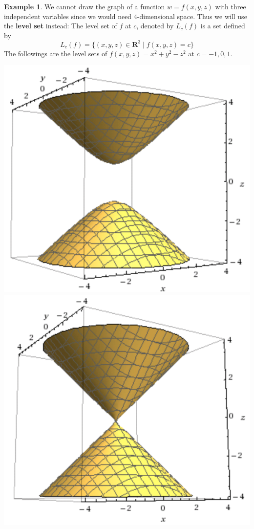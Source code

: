 \documentclass{beamer}
\theoremstyle{plain}
\theoremstyle{definition}
\newtheorem{exmp}[thm]{Example}
\begin{document}
\begin{frame}
\begin{exmp}
	We cannot draw the graph of a function 
	$w=f(x,y,z)$ with three independent variables
	since we would need $4$-dimensional space.
	Thus we will use the \textbf{level set} 
	instead: The level set of $f$ at $c$,
	denoted by $L_c(f)$ is a set defined by
		$$L_c(f)=\{(x,y,z)\in\mathbf R^3\mid
		f(x,y,z)=c\}$$
	The followings are the level sets of 
	$f(x,y,z)=x^2+y^2-z^2$ at $c=-1,0,1$.\\
	\begin{center}
	\includegraphics[scale=.13]{image/week-02-01}
	\includegraphics[scale=.13]{image/week-02-02}

\end{center}
\end{exmp}
\end{frame}
\end{document}

